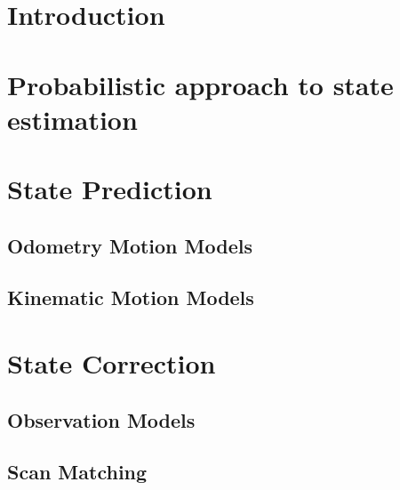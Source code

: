 \section{Introduction}

\section{Probabilistic approach to state estimation}

\section{State Prediction}
\subsection{Odometry Motion Models}
\subsection{Kinematic Motion Models}

\section{State Correction}
\subsection{Observation Models}
\subsection{Scan Matching}
